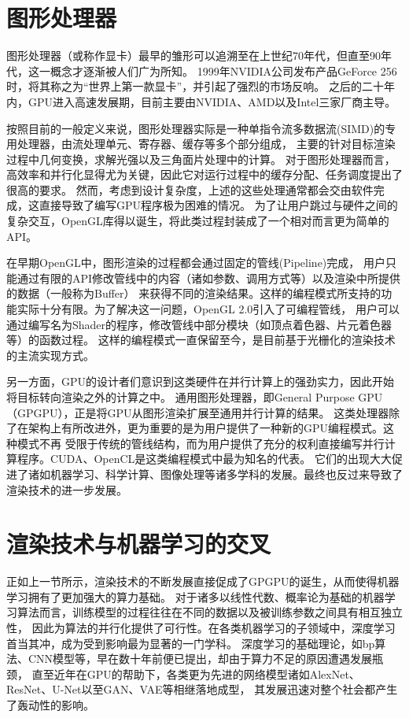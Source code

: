 \section{图形处理器}
图形处理器（或称作显卡）最早的雏形可以追溯至在上世纪70年代，但直至90年代，这一概念才逐渐被人们广为所知。
1999年NVIDIA公司发布产品GeForce 256时，将其称之为“世界上第一款显卡”\cite{firstGPU}，并引起了强烈的市场反响。
之后的二十年内，GPU进入高速发展期，目前主要由NVIDIA、AMD以及Intel三家厂商主导。

按照目前的一般定义来说，图形处理器实际是一种单指令流多数据流(SIMD)的专用处理器，由流处理单元、寄存器、缓存等多个部分组成，
主要的针对目标渲染过程中几何变换，求解光强以及三角面片处理中的计算。
对于图形处理器而言，高效率和并行化显得尤为关键，因此它对运行过程中的缓存分配、任务调度提出了很高的要求。
然而，考虑到设计复杂度，上述的这些处理通常都会交由软件完成，这直接导致了编写GPU程序极为困难的情况。
为了让用户跳过与硬件之间的复杂交互，OpenGL库得以诞生，将此类过程封装成了一个相对而言更为简单的API。

在早期OpenGL中，图形渲染的过程都会通过固定的管线(Pipeline)完成，
用户只能通过有限的API修改管线中的内容（诸如参数、调用方式等）以及渲染中所提供的数据（一般称为Buffer）
来获得不同的渲染结果。这样的编程模式所支持的功能实际十分有限。为了解决这一问题，OpenGL 2.0引入了可编程管线，
用户可以通过编写名为Shader的程序，修改管线中部分模块（如顶点着色器、片元着色器等）的函数过程。
这样的编程模式一直保留至今，是目前基于光栅化的渲染技术的主流实现方式。

另一方面，GPU的设计者们意识到这类硬件在并行计算上的强劲实力，因此开始将目标转向渲染之外的计算之中。
通用图形处理器，即General Purpose GPU（GPGPU），正是将GPU从图形渲染扩展至通用并行计算的结果。
这类处理器除了在架构上有所改进外，更为重要的是为用户提供了一种新的GPU编程模式。这种模式不再
受限于传统的管线结构，而为用户提供了充分的权利直接编写并行计算程序。CUDA、OpenCL是这类编程模式中最为知名的代表。
它们的出现大大促进了诸如机器学习、科学计算、图像处理等诸多学科的发展。最终也反过来导致了渲染技术的进一步发展。

\section{渲染技术与机器学习的交叉}

正如上一节所示，渲染技术的不断发展直接促成了GPGPU的诞生，从而使得机器学习拥有了更加强大的算力基础。
对于诸多以线性代数、概率论为基础的机器学习算法而言，训练模型的过程往往在不同的数据以及被训练参数之间具有相互独立性，
因此为算法的并行化提供了可行性。在各类机器学习的子领域中，深度学习首当其冲，成为受到影响最为显著的一门学科。
深度学习的基础理论，如bp算法、CNN模型等，早在数十年前便已提出，却由于算力不足的原因遭遇发展瓶颈，
直至近年在GPU的帮助下，各类更为先进的网络模型诸如AlexNet、ResNet、U-Net以至GAN、VAE等相继落地成型，
其发展迅速对整个社会都产生了轰动性的影响。


